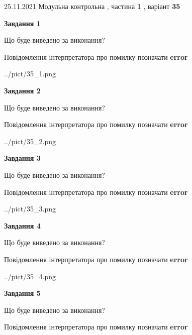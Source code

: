\documentclass[10pt, ukrainian]{article}
\begin{document}
{25.11.2021 Модульна контрольна , частина \textbf { 1 }, варіант  \No \textbf { 35 }\par}
{
\begin {large}

{\begin {center}\textbf{Завдання 1}\end {center}}\par
Що буде виведено за виконання? \par
Повідомлення інтерпретатора про помилку позначати \textbf{error}

\begin{center}
	{../pict/35_1.png}
\end{center}
\newpage

{\begin {center}\textbf{Завдання 2}\end {center}}\par
Що буде виведено за виконання? \par
Повідомлення інтерпретатора про помилку позначати \textbf{error}

\begin{center}
	{../pict/35_2.png}
\end{center}
\newpage

{\begin {center}\textbf{Завдання 3}\end {center}}\par
Що буде виведено за виконання? \par
Повідомлення інтерпретатора про помилку позначати \textbf{error}

\begin{center}
	{../pict/35_3.png}
\end{center}
\newpage

{\begin {center}\textbf{Завдання 4}\end {center}}\par
Що буде виведено за виконання? \par
Повідомлення інтерпретатора про помилку позначати \textbf{error}

\begin{center}
	{../pict/35_4.png}
\end{center}
\newpage

{\begin {center}\textbf{Завдання 5}\end {center}}\par
Що буде виведено за виконання? \par
Повідомлення інтерпретатора про помилку позначати \textbf{error}


\end{large}}
\end{document}
